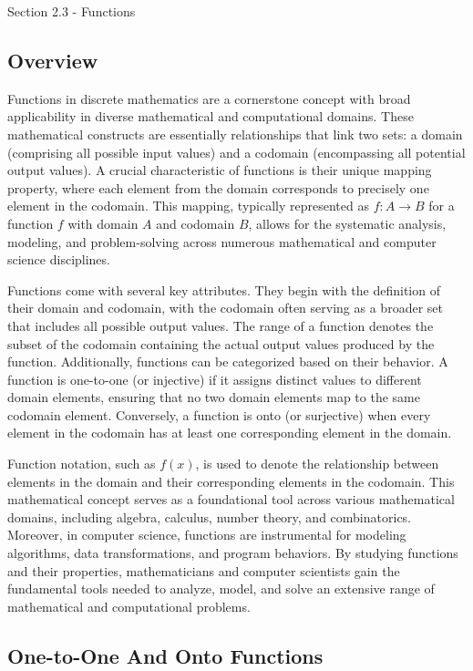 \begin{notes}{Section 2.3 - Functions}
    \subsection*{Overview}

    Functions in discrete mathematics are a cornerstone concept with broad applicability in diverse mathematical and computational domains. These mathematical constructs are essentially relationships that 
    link two sets: a domain (comprising all possible input values) and a codomain (encompassing all potential output values). A crucial characteristic of functions is their unique mapping property, where 
    each element from the domain corresponds to precisely one element in the codomain. This mapping, typically represented as $f: A \rightarrow B$ for a function $f$ with domain $A$ and codomain $B$, allows 
    for the systematic analysis, modeling, and problem-solving across numerous mathematical and computer science disciplines.

    Functions come with several key attributes. They begin with the definition of their domain and codomain, with the codomain often serving as a broader set that includes all possible output values. The 
    range of a function denotes the subset of the codomain containing the actual output values produced by the function. Additionally, functions can be categorized based on their behavior. A function is 
    one-to-one (or injective) if it assigns distinct values to different domain elements, ensuring that no two domain elements map to the same codomain element. Conversely, a function is onto (or surjective) 
    when every element in the codomain has at least one corresponding element in the domain.
    
    Function notation, such as $f(x)$, is used to denote the relationship between elements in the domain and their corresponding elements in the codomain. This mathematical concept serves as a foundational 
    tool across various mathematical domains, including algebra, calculus, number theory, and combinatorics. Moreover, in computer science, functions are instrumental for modeling algorithms, data transformations, 
    and program behaviors. By studying functions and their properties, mathematicians and computer scientists gain the fundamental tools needed to analyze, model, and solve an extensive range of mathematical 
    and computational problems.

    \subsection*{One-to-One And Onto Functions}


\end{notes}
